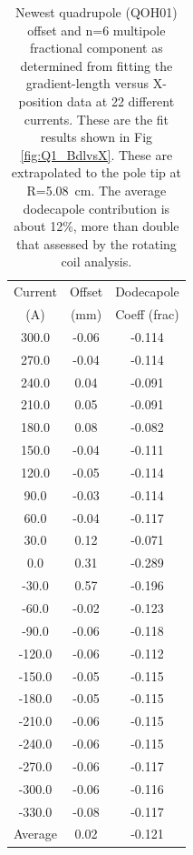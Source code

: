 \documentclass[12pt]{article}
\begin{document}
\begin{table}[ht]
\begin{center}
\caption{\label{tab:q1_multipole}Newest quadrupole (QOH01) offset and n=6 multipole fractional component as determined from fitting the gradient-length versus X-position data at 22 different currents. These are the fit results shown in Fig \ref{fig:Q1_BdlvsX}. These are extrapolated to the pole tip at R=5.08~cm. The average dodecapole contribution is about 12\%, more than double that assessed by the rotating coil analysis.} 
\begin{tabular}{|c|c|c|}\hline
Current &Offset & Dodecapole \\ 
(A)     &(mm)   &Coeff (frac)\\ \hline 
  300.0 & -0.06 &     -0.114 \\ \hline
  270.0 & -0.04 &     -0.114 \\ \hline
  240.0 &  0.04 &     -0.091 \\ \hline
  210.0 &  0.05 &     -0.091 \\ \hline
  180.0 &  0.08 &     -0.082 \\ \hline
  150.0 & -0.04 &     -0.111 \\ \hline
  120.0 & -0.05 &     -0.114 \\ \hline
   90.0 & -0.03 &     -0.114 \\ \hline
   60.0 & -0.04 &     -0.117 \\ \hline
   30.0 &  0.12 &     -0.071 \\ \hline
    0.0 &  0.31 &     -0.289 \\ \hline
  -30.0 &  0.57 &     -0.196 \\ \hline
  -60.0 & -0.02 &     -0.123 \\ \hline
  -90.0 & -0.06 &     -0.118 \\ \hline
 -120.0 & -0.06 &     -0.112 \\ \hline
 -150.0 & -0.05 &     -0.115 \\ \hline
 -180.0 & -0.05 &     -0.115 \\ \hline
 -210.0 & -0.06 &     -0.115 \\ \hline
 -240.0 & -0.06 &     -0.115 \\ \hline
 -270.0 & -0.06 &     -0.117 \\ \hline
 -300.0 & -0.06 &     -0.116 \\ \hline
 -330.0 & -0.08 &     -0.117 \\ \hline
\hline
Average &  0.02 &     -0.121 \\ \hline 
\end{tabular}
\end{center}
\end{table}
\end{document}
